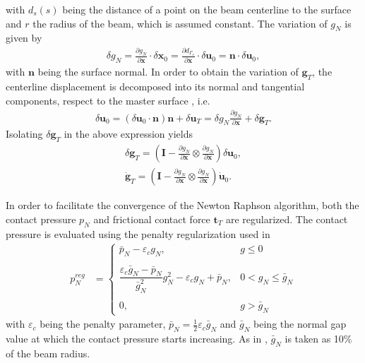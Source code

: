 \documentclass[3p]{elsarticle}
\newcommand{\vect}[1]{\boldsymbol{#1}}
\begin{document}
\noindent with $d_{s}(s)$ being the distance of a point on the beam centerline to the surface and $r$ the radius of the beam, which is assumed constant. The variation of $g_N$ is given by
\begin{align}
	\delta g_N = \frac{\partial g_N}{\partial\vect{x}}\cdot\delta\vect{x}_0 = \frac{\partial d_{\Gamma_s}}{\partial\vect{x}}\cdot\delta\vect{u}_0 = \vect{n}\cdot\delta\vect{u}_0,\label{eq:delta-gN}
\end{align}
\noindent with $\vect{n}$ being the surface normal. In order to obtain the variation of $\vect{g}_T$, the centerline displacement is decomposed into its normal and tangential components, respect to the master surface \cite{Ortega2017}, i.e.
\begin{align}
	\delta\vect{u}_0 = \left(\delta\vect{u}_0\cdot\vect{n}\right)\vect{n} + \delta\vect{u}_T = \delta g_N\frac{\partial g_N}{\partial\vect{x}}+\delta\vect{g}_T.
\end{align}
\noindent Isolating $\delta\vect{g}_T$ in the above expression yields
\begin{align}
	\delta\vect{g}_T =\left(\vect{I}-\frac{\partial g_N}{\partial\vect{x}}\otimes\frac{\partial g_N}{\partial\vect{x}}\right)\delta\vect{u}_0,\label{eq:delta-gT}\\
	\dot{\vect{g}}_T = \left(\vect{I}-\frac{\partial g_N}{\partial\vect{x}}\otimes\frac{\partial g_N}{\partial\vect{x}}\right)\dot{\vect{u}}_0.
\end{align}

In order to facilitate the convergence of the Newton Raphson algorithm, both the contact pressure $p_N$ and frictional contact force $\vect{t}_T$ are regularized. The contact pressure is evaluated using the penalty regularization used in \cite{Durville2012,Meier2016,Meier2017,Meier2017b}
\begin{align}
	p_N^{reg} &= \left\{\begin{array}{ll}
		\bar{p}_N-\varepsilon_c g_N,&g\leq 0\\
		&\\
		\dfrac{\varepsilon_c\bar{g}_N-\bar{p}_N}{\bar{g}_N^2}g_N^2-\varepsilon_c g_N + 
		\bar{p}_N,&0<g_N\leq \bar{g}_N\\
		&\\
		0,&g>\bar{g}_N
	\end{array}\right.\label{eq:pN}
\end{align}
\noindent with $\varepsilon_c$ being the penalty parameter, $\bar{p}_N=\frac{1}{2}\varepsilon_c\bar{g}_N$ and $\bar{g}_N$ being the normal gap value at which the contact pressure starts increasing. As in \cite{Meier2017}, $\bar{g}_N$ is taken as 10\% of the beam radius. 
\end{document}
